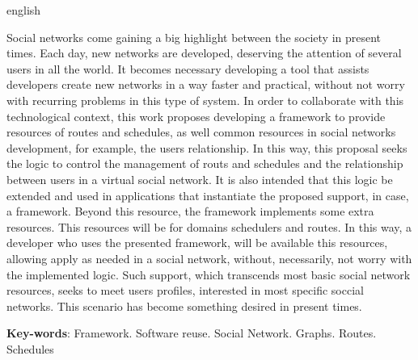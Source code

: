 \begin{resumo}[Abstract]
 \begin{otherlanguage*}{english}
   
   Social networks come gaining a big highlight between the society in present times. Each day, new networks are developed, deserving the attention of several users in all the world. It becomes necessary developing a tool that assists developers create new networks in a way faster and practical, without not worry with recurring problems in this type of system. In order to collaborate with this technological context, this work proposes developing a framework to provide resources of routes and schedules, as well common resources in social networks development, for example, the users relationship. In this way, this proposal seeks the logic to control the management of routs and schedules and the relationship between users in a virtual social network. It is also intended that this logic be extended and used in applications that instantiate the proposed support, in case, a framework. Beyond this resource, the framework implements some extra resources. This resources will be for domains schedulers and routes. In this way, a developer who uses the presented framework, will be available this resources, allowing apply as needed in a social network, without, necessarily, not worry with the implemented logic. Such support, which transcends most basic social network resources, seeks to meet users profiles, interested in most specific soccial networks. This scenario has become something desired in present times.

   \vspace{\onelineskip}
 
   \noindent 
   \textbf{Key-words}: Framework. Software reuse. Social Network. Graphs. Routes. Schedules
 \end{otherlanguage*}
\end{resumo}
